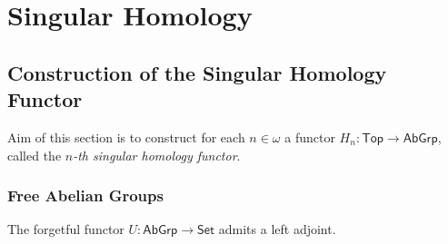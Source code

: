\chapter{Singular Homology}
\section*{Construction of the Singular Homology Functor}

Aim of this section is to construct for each $n \in \omega$ a functor $H_n : \mathsf{Top} \to \mathsf{AbGrp}$, called the \textit{$n$-th singular homology functor}.

\subsection*{Free Abelian Groups}

\begin{proposition}
	The forgetful functor $U : \mathsf{AbGrp} \to \mathsf{Set}$ admits a left adjoint.
	\label{prop:F_set_abgrp}
\end{proposition}

